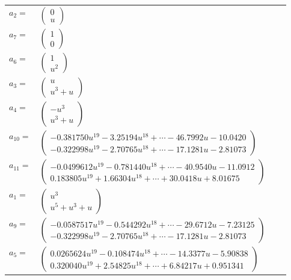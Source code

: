 \documentclass[1p]{elsarticle_modified}
\theoremstyle{definition}
\begin{document}
\begin{tabular}{m{7pt} m{180pt} m{7pt} m{180pt} }
\flushright $a_{2}=$&$\begin{pmatrix}0\\u\end{pmatrix}$ \\
\flushright $a_{7}=$&$\begin{pmatrix}1\\0\end{pmatrix}$ \\
\flushright $a_{6}=$&$\begin{pmatrix}1\\u^2\end{pmatrix}$ \\
\flushright $a_{3}=$&$\begin{pmatrix}u\\u^3+u\end{pmatrix}$ \\
\flushright $a_{4}=$&$\begin{pmatrix}- u^3\\u^3+u\end{pmatrix}$ \\
\flushright $a_{10}=$&$\begin{pmatrix}-0.381750 u^{19}-3.25194 u^{18}+\cdots-46.7992 u-10.0420\\-0.322998 u^{19}-2.70765 u^{18}+\cdots-17.1281 u-2.81073\end{pmatrix}$ \\
\flushright $a_{11}=$&$\begin{pmatrix}-0.0499612 u^{19}-0.781440 u^{18}+\cdots-40.9540 u-11.0912\\0.183805 u^{19}+1.66304 u^{18}+\cdots+30.0418 u+8.01675\end{pmatrix}$ \\
\flushright $a_{1}=$&$\begin{pmatrix}u^3\\u^5+u^3+u\end{pmatrix}$ \\
\flushright $a_{9}=$&$\begin{pmatrix}-0.0587517 u^{19}-0.544292 u^{18}+\cdots-29.6712 u-7.23125\\-0.322998 u^{19}-2.70765 u^{18}+\cdots-17.1281 u-2.81073\end{pmatrix}$ \\
\flushright $a_{5}=$&$\begin{pmatrix}0.0265624 u^{19}-0.108474 u^{18}+\cdots-14.3377 u-5.90838\\0.320040 u^{19}+2.54825 u^{18}+\cdots+6.84217 u+0.951341\end{pmatrix}$ \\

\end{tabular}
\end{document}
